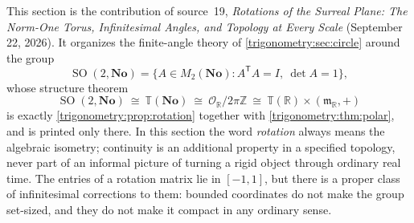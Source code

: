\documentclass[11pt,letterpaper]{article}
\numberwithin{equation}{section}
\theoremstyle{definition}
\theoremstyle{remark}
\newcommand{\No}{\mathbf{No}}
\newcommand{\R}{\mathbb R}
\newcommand{\Z}{\mathbb Z}
\newcommand{\OO}{\mathcal O}
\newcommand{\mm}{\mathfrak m}
\newcommand{\TT}{\mathbb T}
\newcommand{\SO}{\operatorname{SO}}
\begin{document}
This section is the contribution of source~19, \emph{Rotations of the Surreal Plane: The Norm-One
Torus, Infinitesimal Angles, and Topology at Every Scale} (September 22, 2026). It organizes the
finite-angle theory of \cref{trigonometry:sec:circle} around the group
\begin{equation}\label{trigonometry:rot:eq:defG}
 \SO(2,\No)=\{A\in M_2(\No):A^{\mathsf T}A=I,\ \det A=1\},
\end{equation}
whose structure theorem
\begin{equation}\label{trigonometry:rot:eq:main}
 \SO(2,\No)\ \cong\ \TT(\No)\ \cong\ \OO_{\R}/2\pi\Z\ \cong\ \TT(\R)\times(\mm_{\R},+)
\end{equation}
is exactly \cref{trigonometry:prop:rotation} together with \cref{trigonometry:thm:polar}, and is
printed only there. In this section the word \emph{rotation} always means the algebraic isometry;
continuity is an additional property in a specified topology, never part of an informal picture of
turning a rigid object through ordinary real time. The entries of a rotation matrix lie in
$[-1,1]$, but there is a proper class of infinitesimal corrections to them: bounded coordinates do
not make the group set-sized, and they do not make it compact in any ordinary sense.
\end{document}
